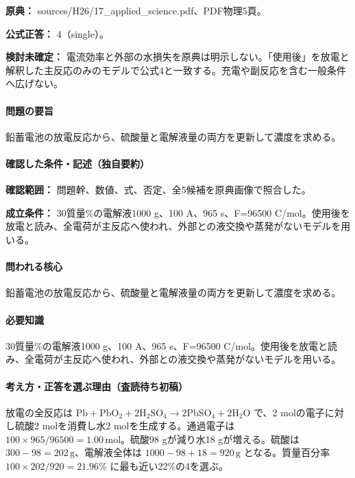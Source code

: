 \noindent\textbf{原典：} sources/H26/17\_applied\_science.pdf、PDF物理5頁。

\textbf{公式正答：} 4（single）。

\par\textbf{検討未確定：} 電流効率と外部の水損失を原典は明示しない。「使用後」を放電と解釈した主反応のみのモデルで公式4と一致する。充電や副反応を含む一般条件へ広げない。

\paragraph{問題の要旨} 鉛蓄電池の放電反応から、硫酸量と電解液量の両方を更新して濃度を求める。

\paragraph{確認した条件・記述（独自要約）}\mbox{}\par

\noindent\textbf{確認範囲：} 問題幹、数値、式、否定、全5候補を原典画像で照合した。\par

\noindent\textbf{成立条件：} 30質量\%の電解液1000 g、100 A、965 s、F=\allowbreak{}96500 C/mol。使用後を放電と読み、全電荷が主反応へ使われ、外部との液交換や蒸発がないモデルを用いる。\par

\paragraph{問われる核心} 鉛蓄電池の放電反応から、硫酸量と電解液量の両方を更新して濃度を求める。

\paragraph{必要知識} 30質量\%の電解液1000 g、100 A、965 s、F=\allowbreak{}96500 C/mol。使用後を放電と読み、全電荷が主反応へ使われ、外部との液交換や蒸発がないモデルを用いる。

\paragraph{考え方・正答を選ぶ理由（査読待ち初稿）} 放電の全反応は \(\mathrm{Pb+PbO_2+2H_2SO_4\to2PbSO_4+2H_2O}\) で、2 molの電子に対し硫酸2 molを消費し水2 molを生成する。通過電子は \(100\times965/96500=1.00\,\mathrm{mol}\)。硫酸98 gが減り水18 gが増える。硫酸は \(300-98=202\,\mathrm g\)、電解液全体は \(1000-98+18=920\,\mathrm g\) となる。質量百分率 \(100\times202/920=21.96\%\) に最も近い22\%の4を選ぶ。

